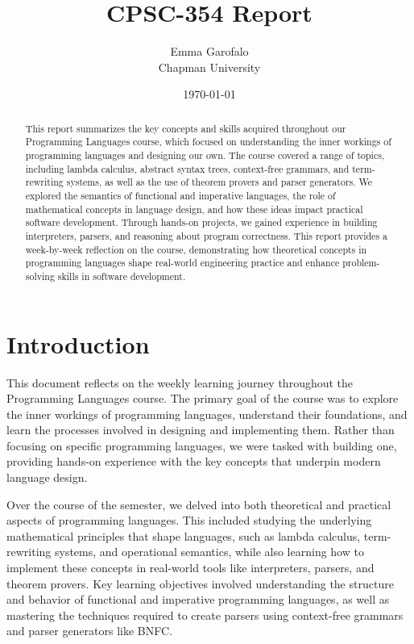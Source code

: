 \documentclass{article}
\title{CPSC-354 Report}
\author{Emma Garofalo  \\ Chapman University}
\date{\today}
\theoremstyle{theorem}
\theoremstyle{definition}
\theoremstyle{remark}
\begin{document}
\maketitle

\begin{abstract}
This report summarizes the key concepts and skills acquired throughout our Programming Languages course, which focused on understanding 
the inner workings of programming languages and designing our own. The course covered a range of topics, including lambda calculus, 
abstract syntax trees, context-free grammars, and term-rewriting systems, as well as the use of theorem provers and parser generators. 
We explored the semantics of functional and imperative languages, the role of mathematical concepts in language design, and how these 
ideas impact practical software development. Through hands-on projects, we gained experience in building interpreters, parsers, and 
reasoning about program correctness. This report provides a week-by-week reflection on the course, demonstrating how theoretical 
concepts in programming languages shape real-world engineering practice and enhance problem-solving skills in software development.
\end{abstract}

\setcounter{tocdepth}{3}
\tableofcontents

\section{Introduction}\label{intro}
This document reflects on the weekly learning journey throughout the Programming Languages course. The primary goal of the course was 
to explore the inner workings of programming languages, understand their foundations, and learn the processes involved in designing and 
implementing them. Rather than focusing on specific programming languages, we were tasked with building one, providing hands-on 
experience with the key concepts that underpin modern language design.

Over the course of the semester, we delved into both theoretical and practical aspects of programming languages. This included studying
the underlying mathematical principles that shape languages, such as lambda calculus, term-rewriting systems, and operational semantics, 
while also learning how to implement these concepts in real-world tools like interpreters, parsers, and theorem provers. Key learning 
objectives involved understanding the structure and behavior of functional and imperative programming languages, as well as mastering the 
techniques required to create parsers using context-free grammars and parser generators like BNFC.
\end{document}
